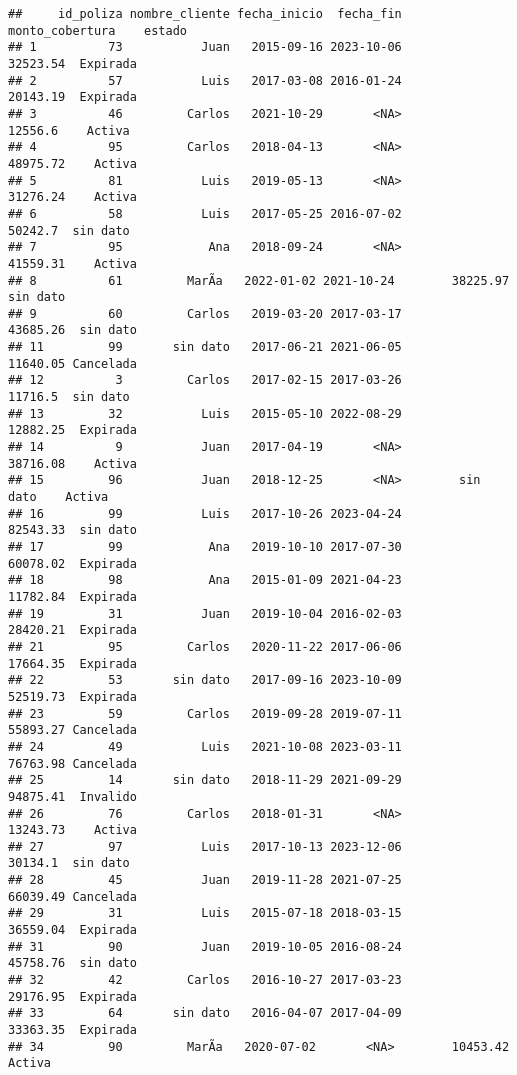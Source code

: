 \documentclass[
]{article}
\begin{document}
\begin{verbatim}
##     id_poliza nombre_cliente fecha_inicio  fecha_fin monto_cobertura    estado
## 1          73           Juan   2015-09-16 2023-10-06        32523.54  Expirada
## 2          57           Luis   2017-03-08 2016-01-24        20143.19  Expirada
## 3          46         Carlos   2021-10-29       <NA>         12556.6    Activa
## 4          95         Carlos   2018-04-13       <NA>        48975.72    Activa
## 5          81           Luis   2019-05-13       <NA>        31276.24    Activa
## 6          58           Luis   2017-05-25 2016-07-02         50242.7  sin dato
## 7          95            Ana   2018-09-24       <NA>        41559.31    Activa
## 8          61         MarÃ­a   2022-01-02 2021-10-24        38225.97  sin dato
## 9          60         Carlos   2019-03-20 2017-03-17        43685.26  sin dato
## 11         99       sin dato   2017-06-21 2021-06-05        11640.05 Cancelada
## 12          3         Carlos   2017-02-15 2017-03-26         11716.5  sin dato
## 13         32           Luis   2015-05-10 2022-08-29        12882.25  Expirada
## 14          9           Juan   2017-04-19       <NA>        38716.08    Activa
## 15         96           Juan   2018-12-25       <NA>        sin dato    Activa
## 16         99           Luis   2017-10-26 2023-04-24        82543.33  sin dato
## 17         99            Ana   2019-10-10 2017-07-30        60078.02  Expirada
## 18         98            Ana   2015-01-09 2021-04-23        11782.84  Expirada
## 19         31           Juan   2019-10-04 2016-02-03        28420.21  Expirada
## 21         95         Carlos   2020-11-22 2017-06-06        17664.35  Expirada
## 22         53       sin dato   2017-09-16 2023-10-09        52519.73  Expirada
## 23         59         Carlos   2019-09-28 2019-07-11        55893.27 Cancelada
## 24         49           Luis   2021-10-08 2023-03-11        76763.98 Cancelada
## 25         14       sin dato   2018-11-29 2021-09-29        94875.41  Invalido
## 26         76         Carlos   2018-01-31       <NA>        13243.73    Activa
## 27         97           Luis   2017-10-13 2023-12-06         30134.1  sin dato
## 28         45           Juan   2019-11-28 2021-07-25        66039.49 Cancelada
## 29         31           Luis   2015-07-18 2018-03-15        36559.04  Expirada
## 31         90           Juan   2019-10-05 2016-08-24        45758.76  sin dato
## 32         42         Carlos   2016-10-27 2017-03-23        29176.95  Expirada
## 33         64       sin dato   2016-04-07 2017-04-09        33363.35  Expirada
## 34         90         MarÃ­a   2020-07-02       <NA>        10453.42    Activa

\end{verbatim}
\end{document}
